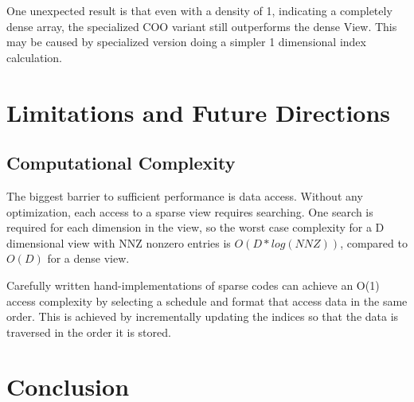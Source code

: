 


One unexpected result is that even with a density of 1, indicating a completely dense array, the specialized COO variant still outperforms the dense View. 
This may be caused by specialized version doing a simpler 1 dimensional index calculation.


\section{Limitations and Future Directions}

\subsection{Computational Complexity}
The biggest barrier to sufficient performance is data access. Without any optimization, each access to a sparse view requires searching. One search is required for each dimension in the view, so the worst case complexity for a D dimensional view with NNZ nonzero entries is $O( D*log(NNZ))$, compared to $O(D)$ for a dense view. 

Carefully written hand-implementations of sparse codes can achieve an O(1) access complexity by selecting a schedule and format that access data in the same order. This is achieved by incrementally updating the indices so that the data is traversed in the order it is stored. 



\section{Conclusion}










